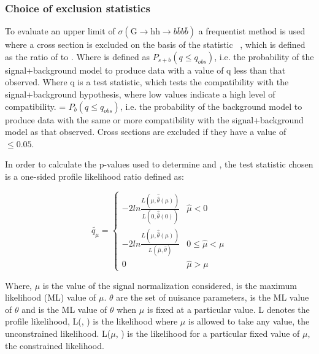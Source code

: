 
\subsubsection{Choice of exclusion statistics}

To evaluate an upper limit of $\sigma(\mathrm{G} \to{\mathrm{hh}}\to b\bar{b}b\bar{b})$  a frequentist method is used where a cross section is excluded on the basis of the statistic  \cls~\cite{Read:2002hq}, which is defined as the ratio of \clsb to \clb. Where \clsb is defined as $P_{s+b}(q \le q_{obs})$, i.e. the probability of the signal+background  model to produce data with a value of q less than that observed. Where q is a test statistic, which tests the compatibility with the signal+background hypothesis, where low values indicate a high level of compatibility. \clb = $P_{b}(q \le q_{obs})$, i.e. the probability of the background model to produce data with the same or more compatibility with the signal+background model as that observed. Cross sections are excluded if they have a value of \cls $\le 0.05$.  

In order to calculate the p-values used to determine \clsb and \clb, the test statistic chosen is a one-sided profile likelihood ratio defined as:

\begin{equation}
  \widetilde{q_{\mu}} =
  \begin{cases}
    -2ln \frac{L(\mu,\hat{\hat{\theta}}(\mu))}{L(0,\hat{\hat{\theta}}(0))} & \hat{\mu} < 0 \\
    -2ln \frac{L(\mu,\hat{\hat{\theta}}(\mu))}{L(\hat{\mu},\hat{\theta})} & 0 \le \hat{\mu} < \mu \\
    0 & \hat{\mu} > \mu
  \end{cases} 
\end{equation}

\noindent 
Where, $\mu$ is the value of the signal normalization considered, \muhat is the maximum likelihood (ML) value of $\mu$. $\theta$ are the set of nuisance parameters, \thetahat is the ML value of $\theta$ and \thetahathat is the ML value of $\theta$ when $\mu$ is fixed at a particular value. L denotes the profile likelihood, L(\muhat, \thetahat) is the likelihood where $\mu$ is allowed to take any value, the unconstrained likelihood. L($\mu$, \thetahathat) is the likelihood for a particular fixed value of $\mu$, the constrained likelihood.

